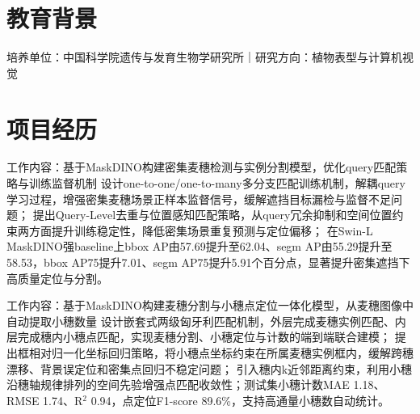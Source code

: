 \documentclass{resume}
\begin{document}

\sepspace
{}


\vspace{-4mm}
\section{教育背景}
{培养单位：中国科学院遗传与发育生物学研究所｜研究方向：植物表型与计算机视觉}



\sepspace
\section{项目经历}

{工作内容：基于MaskDINO构建密集麦穗检测与实例分割模型，优化query匹配策略与训练监督机制}
\Content
{ 设计one-to-one/one-to-many多分支匹配训练机制，解耦query学习过程，增强密集麦穗场景正样本监督信号，缓解遮挡目标漏检与监督不足问题；}
{ 提出Query-Level去重与位置感知匹配策略，从query冗余抑制和空间位置约束两方面提升训练稳定性，降低密集场景重复预测与定位偏移；}
{ 在Swin-L MaskDINO强baseline上bbox AP由57.69提升至62.04、segm AP由55.29提升至58.53，bbox AP75提升7.01、segm AP75提升5.91个百分点，显著提升密集遮挡下高质量定位与分割。}

{工作内容：基于MaskDINO构建麦穗分割与小穗点定位一体化模型，从麦穗图像中自动提取小穗数量}
\Content
{ 设计嵌套式两级匈牙利匹配机制，外层完成麦穗实例匹配、内层完成穗内小穗点匹配，实现麦穗分割、小穗定位与计数的端到端联合建模；}
{ 提出框相对归一化坐标回归策略，将小穗点坐标约束在所属麦穗实例框内，缓解跨穗漂移、背景误定位和密集点回归不稳定问题；}
{ 引入穗内k近邻距离约束，利用小穗沿穗轴规律排列的空间先验增强点匹配收敛性；测试集小穗计数MAE 1.18、RMSE 1.74、R$^2$ 0.94，点定位F1-score 89.6\%，支持高通量小穗数自动统计。}
\end{document}
